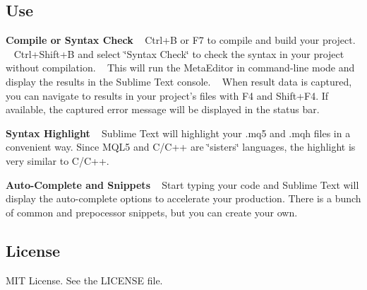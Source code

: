\subsection*{Use }

{\bfseries Compile or Syntax Check} ~\newline
{\ttfamily Ctrl+B} or {\ttfamily F7} to compile and build your project. ~\newline
{\ttfamily Ctrl+\+Shift+B} and select \char`\"{}\+Syntax Check\char`\"{} to check the syntax in your project without compilation. ~\newline
This will run the Meta\+Editor in command-\/line mode and display the results in the Sublime Text console. ~\newline
When result data is captured, you can navigate to results in your project’s files with {\ttfamily F4} and {\ttfamily Shift+\+F4}. If available, the captured error message will be displayed in the status bar.

{\bfseries Syntax Highlight} ~\newline
Sublime Text will highlight your {\ttfamily .mq5} and {\ttfamily .mqh} files in a convenient way. Since M\+Q\+L5 and C/\+C++ are \char`\"{}sisters\char`\"{} languages, the highlight is very similar to C/\+C++.

{\bfseries Auto-\/\+Complete and Snippets} ~\newline
Start typing your code and Sublime Text will display the auto-\/complete options to accelerate your production. There is a bunch of common and prepocessor snippets, but you can create your own.

\subsection*{License }

M\+IT License. See the {\ttfamily L\+I\+C\+E\+N\+SE} file. 